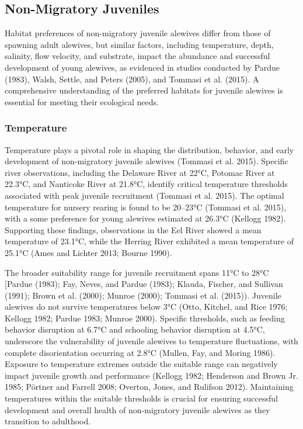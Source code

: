 \documentclass[
]{book}
\begin{document}
\hypertarget{non-migratory-juveniles}{%
\subsection{Non-Migratory Juveniles}\label{non-migratory-juveniles}}

Habitat preferences of non-migratory juvenile alewives differ from those of spawning adult alewives, but similar factors, including temperature, depth, salinity, flow velocity, and substrate, impact the abundance and successful development of young alewives, as evidenced in studies conducted by Pardue (1983), Walsh, Settle, and Peters (2005), and Tommasi et al. (2015). A comprehensive understanding of the preferred habitats for juvenile alewives is essential for meeting their ecological needs.

\hypertarget{temperature-1}{%
\subsubsection{Temperature}\label{temperature-1}}

Temperature plays a pivotal role in shaping the distribution, behavior, and early development of non-migratory juvenile alewives (Tommasi et al. 2015). Specific river observations, including the Delaware River at 22°C, Potomac River at 22.3°C, and Nanticoke River at 21.8°C, identify critical temperature thresholds associated with peak juvenile recruitment (Tommasi et al. 2015). The optimal temperature for nursery rearing is found to be 20--23°C (Tommasi et al. 2015), with a some preference for young alewives estimated at 26.3°C (Kellogg 1982). Supporting these findings, observations in the Eel River showed a mean temperature of 23.1°C, while the Herring River exhibited a mean temperature of 25.1°C (Ames and Lichter 2013; Bourne 1990).

The broader suitability range for juvenile recruitment spans 11°C to 28°C {[}Pardue (1983); Fay, Neves, and Pardue (1983); Klauda, Fischer, and Sullivan (1991); Brown et al. (2000); Munroe (2000); Tommasi et al. (2015)). Juvenile alewives do not survive temperatures below 3°C (Otto, Kitchel, and Rice 1976; Kellogg 1982; Pardue 1983; Munroe 2000). Specific thresholds, such as feeding behavior disruption at 6.7°C and schooling behavior disruption at 4.5°C, underscore the vulnerability of juvenile alewives to temperature fluctuations, with complete disorientation occurring at 2.8°C (Mullen, Fay, and Moring 1986). Exposure to temperature extremes outside the suitable range can negatively impact juvenile growth and performance (Kellogg 1982; Henderson and Brown Jr. 1985; Pörtner and Farrell 2008; Overton, Jones, and Rulifson 2012). Maintaining temperatures within the suitable thresholds is crucial for ensuring successful development and overall health of non-migratory juvenile alewives as they transition to adulthood.
\end{document}
